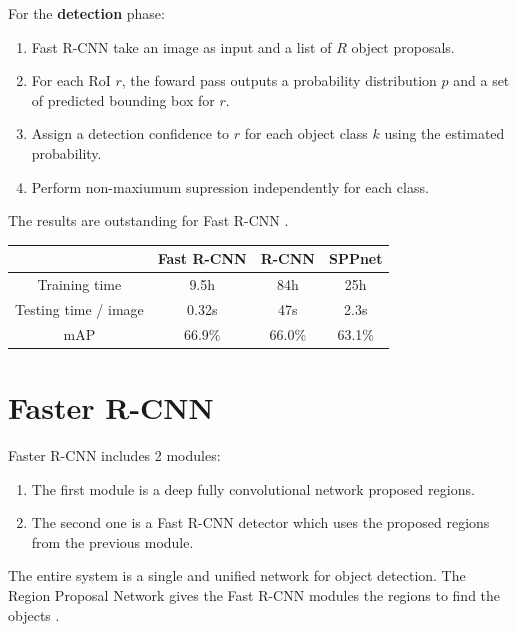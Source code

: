 \documentclass{article}
\begin{document}
For the \textbf{detection} phase:
\begin{enumerate}
	\item Fast R-CNN take an image as input and a list of $R$ object proposals.
	\item For each RoI $r$, the foward pass outputs a probability distribution $p$ and a set of predicted bounding box for $r$.
	\item Assign a detection confidence to $r$ for each object class $k$ using the estimated probability.
	\item Perform non-maxiumum supression independently for each class.
\end{enumerate}

The results are outstanding for Fast R-CNN \cite{slides/fast-rcnn}.

\begin{center}
	\begin{tabular}{| c | c | c | c |}
		\hline
		 & \textbf{Fast R-CNN} & \textbf{R-CNN}	& \textbf{SPPnet} \\
		\hline
		Training time & 9.5h & 84h & 25h \\
		Testing time / image & 0.32s & 47s & 2.3s  \\
		mAP & 66.9\% & 66.0\% & 63.1\% \\
		\hline
	\end{tabular}
\end{center}

\section{Faster R-CNN }

Faster R-CNN includes 2 modules:
\begin{enumerate}
	\item The first module is a deep fully convolutional network proposed regions.
	\item The second one is a Fast R-CNN detector which uses the proposed regions from the previous module.
\end{enumerate}

The entire system is a single and unified network for object detection. The Region Proposal Network gives the Fast R-CNN modules the regions to find the objects \cite{arxiv/faster-rcnn}. 
\end{document}
